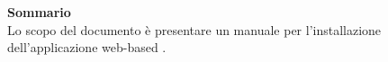 \Large{\textbf{Sommario}}\\
{
\normalsize
Lo scopo del documento è presentare un manuale per l’installazione dell’applicazione web-based \textbf{\mytalk}.
}